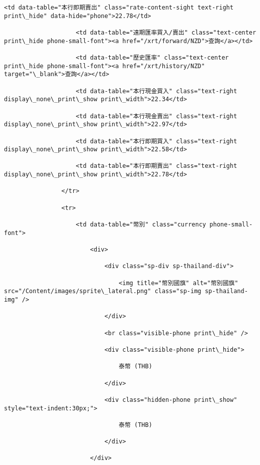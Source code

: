 \documentclass[11pt]{article}
\begin{document}
\begin{Verbatim}[commandchars=\\\{\}]
                    <td data-table="本行即期賣出" class="rate-content-sight text-right print\_hide" data-hide="phone">22.78</td>

                    <td data-table="遠期匯率買入/賣出" class="text-center print\_hide phone-small-font"><a href="/xrt/forward/NZD">查詢</a></td>

                    <td data-table="歷史匯率" class="text-center print\_hide phone-small-font"><a href="/xrt/history/NZD" target="\_blank">查詢</a></td>

                    <td data-table="本行現金買入" class="text-right display\_none\_print\_show print\_width">22.34</td>

                    <td data-table="本行現金賣出" class="text-right display\_none\_print\_show print\_width">22.97</td>

                    <td data-table="本行即期買入" class="text-right display\_none\_print\_show print\_width">22.58</td>

                    <td data-table="本行即期賣出" class="text-right display\_none\_print\_show print\_width">22.78</td>

                </tr>

                <tr>

                    <td data-table="幣別" class="currency phone-small-font">

                        <div>

                            <div class="sp-div sp-thailand-div">

                                <img title="幣別國旗" alt="幣別國旗" src="/Content/images/sprite\_lateral.png" class="sp-img sp-thailand-img" />

                            </div>

                            <br class="visible-phone print\_hide" />

                            <div class="visible-phone print\_hide">

                                泰幣 (THB)

                            </div>

                            <div class="hidden-phone print\_show" style="text-indent:30px;">

                                泰幣 (THB)

                            </div>

                        </div>


\end{Verbatim}
\end{document}
